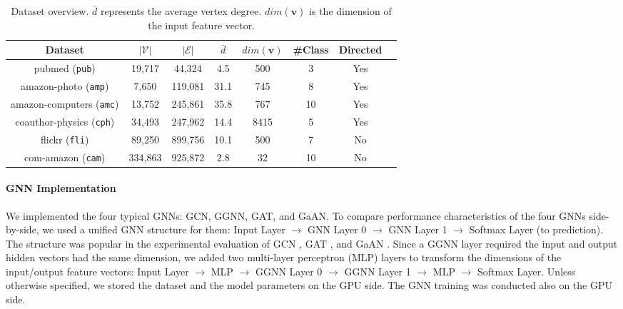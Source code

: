 \begin{table}[H]
    \centering
    \begin{tabular}{cccccccc}
        \toprule
        Dataset                                                 & $|\mathcal{V}|$ & $|\mathcal{E}|$ & $\bar{d}$ & $dim(\boldsymbol{v})$ & \#Class & Directed \\
        \midrule
        pubmed (\texttt{pub}) \cite{chen2018_fastgcn}  & 19,717          & 44,324          & 4.5       & 500                   & 3       & Yes      \\
        amazon-photo (\texttt{amp}) \cite{shchur2018_pitfall_of_gnn}     & 7,650           & 119,081         & 31.1      & 745                   & 8       & Yes      \\
        amazon-computers (\texttt{amc}) \cite{shchur2018_pitfall_of_gnn} & 13,752          & 245,861         & 35.8      & 767                   & 10      & Yes      \\
        coauthor-physics (\texttt{cph}) \cite{shchur2018_pitfall_of_gnn} & 34,493          & 247,962         & 14.4      & 8415                  & 5       & Yes      \\
        flickr (\texttt{fli}) \cite{zeng2020_graphsaint}                 & 89,250          & 899,756         & 10.1      & 500                   & 7       & No       \\
        com-amazon (\texttt{cam}) \cite{yang2012_defining}               & 334,863         & 925,872         & 2.8       & 32                    & 10      & No       \\
        \bottomrule
    \end{tabular}
    \caption{Dataset overview. $\bar{d}$ represents the average vertex degree. $dim(\boldsymbol{v})$ is the dimension of the input feature vector.}
    \label{tab:dataset_overview}
\end{table}



\paragraph{GNN Implementation}
We implemented the four typical GNNs: GCN, GGNN, GAT, and GaAN.
To compare performance characteristics of the four GNNs side-by-side, we used a unified GNN structure for them: Input Layer $\rightarrow$ GNN Layer 0 $\rightarrow$ GNN Layer 1 $\rightarrow$ Softmax Layer (to prediction).
The structure was popular in the experimental evaluation of GCN \cite{kipf2017_gcn}, GAT \cite{huang2018_gat}, and GaAN \cite{zhang2018_gaan}.
Since a GGNN layer required the input and output hidden vectors had the same dimension, we added two multi-layer perceptron (MLP) layers to transform the dimensions of the input/output feature vectors: Input Layer $\rightarrow$ MLP $\rightarrow$ GGNN Layer 0 $\rightarrow$ GGNN Layer 1 $\rightarrow$ MLP $\rightarrow$ Softmax Layer.
Unless otherwise specified, we stored the dataset and the model parameters on the GPU side.
The GNN training was conducted also on the GPU side.


